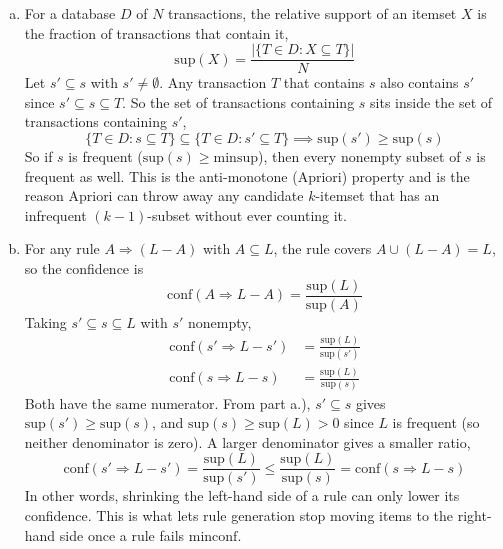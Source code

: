 \documentclass[12pt,letterpaper, onecolumn]{exam}
\newcommand{\minsup}{\mathrm{minsup}}
\newcommand{\minconf}{\mathrm{minconf}}
\begin{document}
\begin{questions}
\begin{solution}
        \begin{enumerate}[a.)]
            \item For a database $D$ of $N$ transactions, the relative support of an itemset $X$ is the fraction of transactions that contain it,
            \begin{equation*}
                \text{sup}(X) = \frac{|\{T\in D : X\subseteq T\}|}{N}
            \end{equation*}
            Let $s'\subseteq s$ with $s'\neq\emptyset$. Any transaction $T$ that contains $s$ also contains $s'$ since $s'\subseteq s\subseteq T$. So the set of transactions containing $s$ sits inside the set of transactions containing $s'$,
            \begin{equation*}
                \{T\in D : s\subseteq T\} \subseteq \{T\in D : s'\subseteq T\} \implies \text{sup}(s') \geq \text{sup}(s)
            \end{equation*}
            So if $s$ is frequent ($\text{sup}(s)\geq \minsup$), then every nonempty subset of $s$ is frequent as well. This is the anti-monotone (Apriori) property and is the reason Apriori can throw away any candidate $k$-itemset that has an infrequent $(k-1)$-subset without ever counting it.
            \item For any rule $A\Rightarrow (L-A)$ with $A\subseteq L$, the rule covers $A\cup(L-A)=L$, so the confidence is
            \begin{equation*}
                \text{conf}(A\Rightarrow L-A) = \frac{\text{sup}(L)}{\text{sup}(A)}
            \end{equation*}
            Taking $s'\subseteq s\subseteq L$ with $s'$ nonempty,
            \begin{align*}
                \text{conf}(s'\Rightarrow L-s') &= \frac{\text{sup}(L)}{\text{sup}(s')} \\
                \text{conf}(s\Rightarrow L-s) &= \frac{\text{sup}(L)}{\text{sup}(s)}
            \end{align*}
            Both have the same numerator. From part a.), $s'\subseteq s$ gives $\text{sup}(s')\geq\text{sup}(s)$, and $\text{sup}(s)\geq\text{sup}(L)>0$ since $L$ is frequent (so neither denominator is zero). A larger denominator gives a smaller ratio,
            \begin{equation*}
                \text{conf}(s'\Rightarrow L-s') = \frac{\text{sup}(L)}{\text{sup}(s')} \leq \frac{\text{sup}(L)}{\text{sup}(s)} = \text{conf}(s\Rightarrow L-s)
            \end{equation*}
            In other words, shrinking the left-hand side of a rule can only lower its confidence. This is what lets rule generation stop moving items to the right-hand side once a rule fails $\minconf$.
        \end{enumerate}


\end{solution}
\end{questions}
\end{document}
